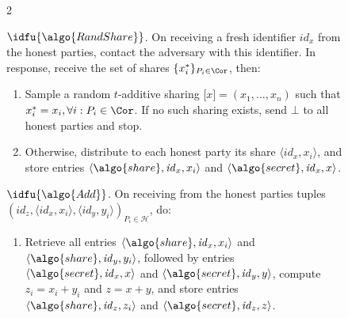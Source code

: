\begin{figure} \centering \hspace*{-0.05\textwidth}
  \begin{minipage}{1.1\textwidth}

    \begin{framed} \scriptsize


      \begin{multicols}{2}

        {$\idfu{\algo{RandShare}}$.} On receiving a fresh identifier
        $\mathit{id}_x$ from the honest parties, contact the adversary with
        this identifier. In response, receive the set of shares
        $\{x^*_i\}_{{P}_i \in \Cor}$, then:

        \begin{enumerate}

          \item Sample a random $t$-additive sharing $\lbrack x\rbrack = (x_1,
            ..., x_n)$ such that $x^*_i = x_i, \forall i : {P}_i \in \Cor$. If
            no such sharing exists, send $\bot$ to all honest parties and stop.

          \item Otherwise, distribute to each honest party its share $\langle
            \mathit{id}_x, x_i\rangle$, and store entries $\langle
            \algo{share}, \mathit{id}_x, x_i \rangle$ and $\langle
            \algo{secret}, \mathit{id}_x, x \rangle$.

        \end{enumerate}

        {$\idfu{\algo{Add}}$.} On receiving from the honest parties tuples
        $(\mathit{id}_z, \langle \mathit{id}_x, x_i\rangle, \langle
        \mathit{id}_y,y_i\rangle)_{{P}_i \in \mathcal{H}}$, do:

        \begin{enumerate}

          \item Retrieve all entries $\langle \algo{share}, \mathit{id}_x,
            x_i\rangle$ and $\langle \algo{share}, \mathit{id}_y, y_i\rangle$,
            followed by entries $\langle \algo{secret}, \mathit{id}_x,
            x\rangle$ and $\langle \algo{secret}, \mathit{id}_y, y\rangle$,
            compute $z_i = x_i+y_i$ and $z = x+y$, and store entries $\langle
            \algo{share}, \mathit{id}_z, z_i\rangle$ and $\langle
            \algo{secret}, \mathit{id}_z, z \rangle$.


\end{enumerate}
\end{multicols}
\end{framed}
\end{minipage}
\end{figure}
